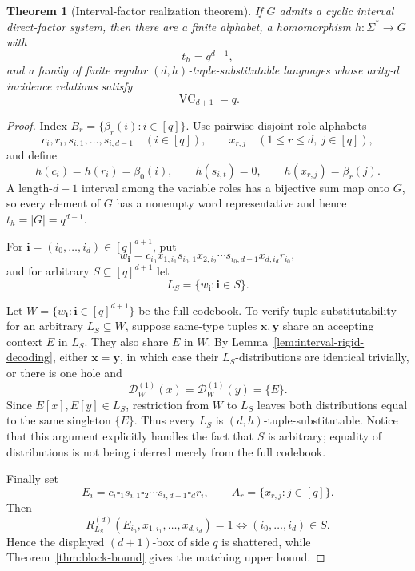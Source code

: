 \documentclass[11pt]{article}
\newtheorem{theorem}{Theorem}[section]
\newcommand{\D}{\mathcal D}
\newcommand{\VC}{\operatorname{VC}}
\newcommand{\blank}{\square}
\begin{document}
\begin{theorem}[Interval-factor realization theorem]
\label{thm:interval-realization}
If \(G\) admits a cyclic interval direct-factor system, then there are a
finite alphabet, a homomorphism \(h:\Sigma^*\to G\) with
\[
 t_h=q^{d-1},
\]
and a family of finite regular \((d,h)\)-tuple-substitutable languages
whose arity-\(d\) incidence relations satisfy
\[
 \VC_{d+1}=q.
\]
\end{theorem}

\begin{proof}
Index \(B_r=\{\beta_r(i):i\in[q]\}\). Use pairwise disjoint role
alphabets
\[
 c_i,r_i,s_{i,1},\ldots,s_{i,d-1}\quad(i\in[q]),
 \qquad
 x_{r,j}\quad(1\le r\le d,\ j\in[q]),
\]
and define
\[
 h(c_i)=h(r_i)=\beta_0(i),\qquad
 h(s_{i,t})=0,\qquad
 h(x_{r,j})=\beta_r(j).
\]
A length-\(d-1\) interval among the variable roles has a bijective sum
map onto \(G\), so every element of \(G\) has a nonempty word
representative and hence \(t_h=|G|=q^{d-1}\).

For \(\mathbf i=(i_0,\ldots,i_d)\in[q]^{d+1}\), put
\[
 w_{\mathbf i}
 =c_{i_0}x_{1,i_1}s_{i_0,1}x_{2,i_2}\cdots
 s_{i_0,d-1}x_{d,i_d}r_{i_0},
\]
and for arbitrary \(S\subseteq[q]^{d+1}\) let
\[
 L_S=\{w_{\mathbf i}:\mathbf i\in S\}.
\]

Let \(W=\{w_{\mathbf i}:\mathbf i\in[q]^{d+1}\}\) be the full
codebook.  To verify tuple substitutability for an arbitrary
\(L_S\subseteq W\), suppose same-type tuples \(\mathbf x,\mathbf y\)
share an accepting context \(E\) in \(L_S\).  They also share \(E\) in
\(W\).  By Lemma~\ref{lem:interval-rigid-decoding}, either
\(\mathbf x=\mathbf y\), in which case their \(L_S\)-distributions are
identical trivially, or there is one hole and
\[
 \D_W^{(1)}(x)=\D_W^{(1)}(y)=\{E\}.
\]
Since \(E[x],E[y]\in L_S\), restriction from \(W\) to \(L_S\) leaves both
distributions equal to the same singleton \(\{E\}\).  Thus every
\(L_S\) is \((d,h)\)-tuple-substitutable.  Notice that this argument
explicitly handles the fact that \(S\) is arbitrary; equality of
distributions is not being inferred merely from the full codebook.

Finally set
\[
 E_i=c_i\blank_1s_{i,1}\blank_2\cdots
 s_{i,d-1}\blank_dr_i,
 \qquad
 A_r=\{x_{r,j}:j\in[q]\}.
\]
Then
\[
 R_{L_S}^{(d)}(E_{i_0},x_{1,i_1},\ldots,x_{d,i_d})=1
 \Longleftrightarrow
 (i_0,\ldots,i_d)\in S.
\]
Hence the displayed \((d+1)\)-box of side \(q\) is shattered, while
Theorem~\ref{thm:block-bound} gives the matching upper bound.
\end{proof}
\end{document}
